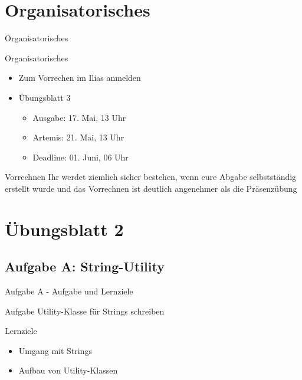 \documentclass[aspectratio=169]{beamer}
\begin{document}
\section{Organisatorisches}
\begin{frame}[fragile]{Organisatorisches}
  \begin{alertblock}{Organisatorisches}
    \begin{itemize}
      \item Zum Vorrechen im Ilias anmelden
      \item Übungsblatt 3 \begin{itemize}
        \item \color{nicegreen}Ausgabe: \color{FGround} 17. Mai, 13 Uhr
        \item \color{numbercolor} Artemis: \color{FGround} 21. Mai, 13 Uhr
        \item \color{alertcolor}Deadline: \color{FGround} 01. Juni, 06 Uhr
      \end{itemize}
    \end{itemize}
  \end{alertblock}
  \begin{block}{Vorrechnen}
    Ihr werdet ziemlich sicher bestehen, wenn eure Abgabe selbstständig erstellt wurde und das Vorrechnen ist deutlich angenehmer als die Präsenzübung
  \end{block}
\end{frame}

\section{Übungsblatt 2}
\subsection{Aufgabe A: String-Utility}
\begin{frame}{Aufgabe A - Aufgabe und Lernziele}
  \begin{block}{Aufgabe}
    \pause
    Utility-Klasse für Strings schreiben
  \end{block}
  \pause
  \begin{block}{Lernziele}
    \begin{itemize}
      \pause
      \item Umgang mit Strings
      \pause
      \item Aufbau von Utility-Klassen
    \end{itemize}
  \end{block}
\end{frame}
\end{document}
